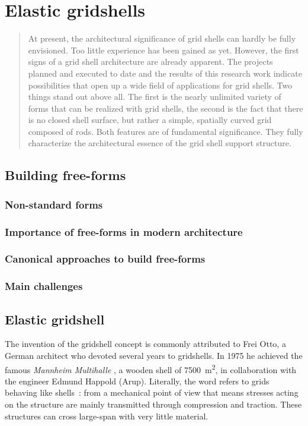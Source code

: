 
\chapter{Elastic gridshells}

\blockcquote[][p.~250]{IL10}{At present, the architectural significance of grid shells can hardly be fully envisioned. Too little experience has been gained as yet. However, the first signs of a grid shell architecture are already apparent. The projects planned and executed to date and the results of this research work indicate possibilities that open up a wide field of applications for grid shells. Two things stand out above all. The first is the nearly unlimited variety of forms that can be realized with grid shells, the second is the fact that there is no closed shell surface, but rather a simple, spatially curved grid composed of rods. Both features are of fundamental significance. They fully characterize the architectural essence of the grid shell support structure.}

\section{Building free-forms}
\subsection{Non-standard forms}
\subsection{Importance of free-forms in modern architecture}
\subsection{Canonical approaches to build free-forms}
\subsection{Main challenges}

\section{Elastic gridshell}

The invention of the gridshell concept is commonly attributed to Frei Otto, a German architect who devoted several years to gridshells. In 1975 he achieved the famous \emph{Mannheim Multihalle} \cite{Happold1975}, a wooden shell of 7500~m\textsuperscript{2}, in collaboration with the engineer Edmund Happold (Arup).
Literally, the word  refers to grids behaving like shells~: from a mechanical point of view that means stresses acting on the structure are mainly transmitted through compression and traction. These structures can cross large-span with very little material.

